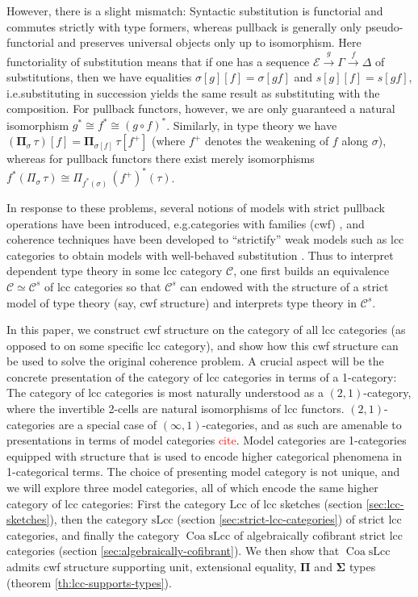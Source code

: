 \documentclass{article}
\newcommand{\todo}[1]{\textcolor{red}{#1}}
\begin{document}
However, there is a slight mismatch:
Syntactic substitution is functorial and commutes strictly with type formers, whereas pullback is generally only pseudo-functorial and preserves universal objects only up to isomorphism.
Here functoriality of substitution means that if one has a sequence $\mathcal{E} \xrightarrow{g} \Gamma \xrightarrow{f} \Delta$ of substitutions, then we have equalities $\sigma[g][f] = \sigma[gf]$ and $s[g][f] = s[gf]$, i.e.\@ substituting in succession yields the same result as substituting with the composition.
For pullback functors, however, we are only guaranteed a natural isomorphism $g^* \cong f^* \cong (g \circ f)^*$.
Similarly, in type theory we have $(\mathbf{\Pi}_\sigma \, \tau)[f] = \mathbf{\Pi}_{\sigma[f]} \, \tau[f^+]$ (where $f^+$ denotes the weakening of $f$ along $\sigma$), whereas for pullback functors there exist merely isomorphisms $f^*(\Pi_\sigma \, \tau) \cong \Pi_{f^*(\sigma)} \, (f^+)^*(\tau)$.

In response to these problems, several notions of models with strict pullback operations have been introduced, e.g.\@ categories with families (cwf) \cite{internal-type-theory}, and coherence techniques have been developed to ``strictify'' weak models such as lcc categories to obtain models with well-behaved substitution \cite{substitution-up-to-isomorphism,on-the-interpretation-of-type-theory-in-lcc-categories,the-local-universes-model}.
Thus to interpret dependent type theory in some lcc category $\mathcal{C}$, one first builds an equivalence $\mathcal{C} \simeq \mathcal{C}^s$ of lcc categories so that $\mathcal{C}^s$ can endowed with the structure of a strict model of type theory (say, cwf structure) and interprets type theory in $\mathcal{C}^s$.

In this paper, we construct cwf structure on the category of all lcc categories (as opposed to on some specific lcc category), and show how this cwf structure can be used to solve the original coherence problem.
A crucial aspect will be the concrete presentation of the category of lcc categories in terms of a 1-category:
The category of lcc categories is most naturally understood as a $(2, 1)$-category, where the invertible 2-cells are natural isomorphisms of lcc functors.
$(2, 1)$-categories are a special case of $(\infty, 1)$-categories, and as such are amenable to presentations in terms of model categories \todo{cite}.
Model categories are 1-categories equipped with structure that is used to encode higher categorical phenomena in 1-categorical terms.
The choice of presenting model category is not unique, and we will explore three model categories, all of which encode the same higher category of lcc categories:
First the category $\mathrm{Lcc}$ of lcc sketches (section \ref{sec:lcc-sketches}), then the category $\mathrm{sLcc}$ (section \ref{sec:strict-lcc-categories}) of strict lcc categories, and finally the category $\operatorname{Coa} \mathrm{sLcc}$ of algebraically cofibrant strict lcc categories (section \ref{sec:algebraically-cofibrant}).
We then show that $\operatorname{Coa} \mathrm{sLcc}$ admits cwf structure supporting unit, extensional equality, $\mathbf{\Pi}$ and $\mathbf{\Sigma}$ types (theorem \ref{th:lcc-supports-types}).
\end{document}
